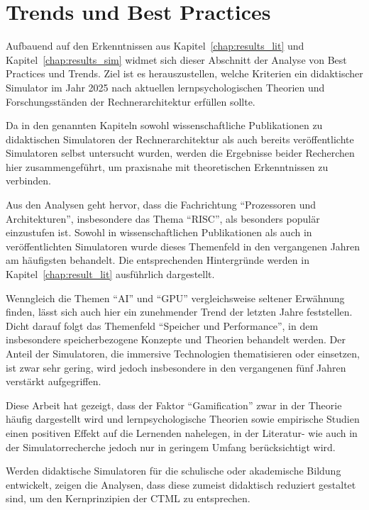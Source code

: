 \section{Trends und Best Practices}

Aufbauend auf den Erkenntnissen aus Kapitel~\ref{chap:results_lit} und Kapitel~\ref{chap:results_sim} widmet sich dieser Abschnitt der Analyse von Best Practices und Trends. Ziel ist es herauszustellen, welche Kriterien ein didaktischer Simulator im Jahr 2025 nach aktuellen lernpsychologischen Theorien und Forschungsständen der Rechnerarchitektur erfüllen sollte.

Da in den genannten Kapiteln sowohl wissenschaftliche Publikationen zu didaktischen Simulatoren der Rechnerarchitektur als auch bereits veröffentlichte Simulatoren selbst untersucht wurden, werden die Ergebnisse beider Recherchen hier zusammengeführt, um praxisnahe mit theoretischen Erkenntnissen zu verbinden.

Aus den Analysen geht hervor, dass die Fachrichtung \enquote{Prozessoren und Architekturen}, insbesondere das Thema \enquote{RISC}, als besonders populär einzustufen ist. Sowohl in wissenschaftlichen Publikationen als auch in veröffentlichten Simulatoren wurde dieses Themenfeld in den vergangenen Jahren am häufigsten behandelt. Die entsprechenden Hintergründe werden in Kapitel~\ref{chap:result_lit} ausführlich dargestellt.

Wenngleich die Themen \enquote{AI} und \enquote{GPU} vergleichsweise seltener Erwähnung finden, lässt sich auch hier ein zunehmender Trend der letzten Jahre feststellen. Dicht darauf folgt das Themenfeld \enquote{Speicher und Performance}, in dem insbesondere speicherbezogene Konzepte und Theorien behandelt werden. Der Anteil der Simulatoren, die immersive Technologien thematisieren oder einsetzen, ist zwar sehr gering, wird jedoch insbesondere in den vergangenen fünf Jahren verstärkt aufgegriffen.

Diese Arbeit hat gezeigt, dass der Faktor \enquote{Gamification} zwar in der Theorie häufig dargestellt wird und lernpsychologische Theorien sowie empirische Studien einen positiven Effekt auf die Lernenden nahelegen, in der Literatur- wie auch in der Simulatorrecherche jedoch nur in geringem Umfang berücksichtigt wird.

Werden didaktische Simulatoren für die schulische oder akademische Bildung entwickelt, zeigen die Analysen, dass diese zumeist didaktisch reduziert gestaltet sind, um den Kernprinzipien der \ac{CTML} zu entsprechen.

